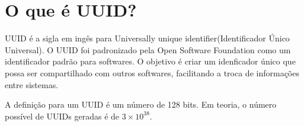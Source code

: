 \section{O que é UUID?}
UUID é a sigla em ingês para Universally unique identifier(Identificador Único Universal).
O UUID foi padronizado pela Open Software Foundation como um identificador padrão para softwares.
O objetivo é criar um idenficador único que possa ser compartilhado com outros softwares, 
facilitando a troca de informações entre sistemas. 

A definição para um UUID é um número de 128 bits.
Em teoria, o número possível de UUIDs geradas é de $3 \times 10^{38}$.
